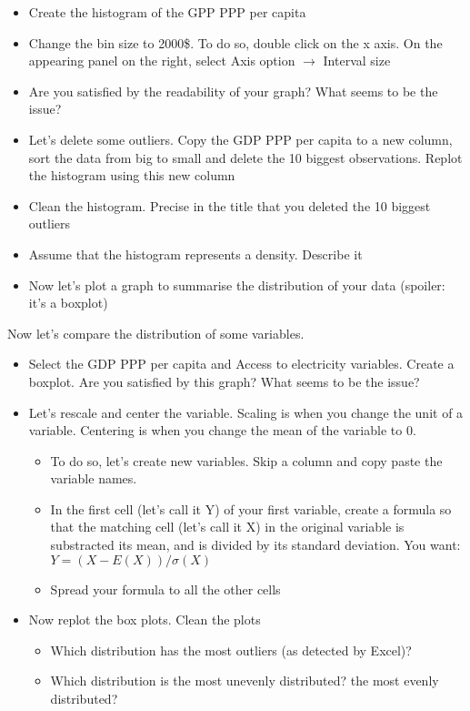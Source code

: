 \documentclass{article}
\begin{document}
    \begin{itemize}
        \item Create the histogram of the GPP PPP per capita
        \item Change the bin size to 2000\$. To do so, double click on the x axis. On the appearing panel on the right, select Axis option $\rightarrow$ Interval size
        \item Are you satisfied by the readability of your graph? What seems to be the issue?
        \item Let's delete some outliers. Copy the GDP PPP per capita to a new column, sort the data from big to small and delete the 10 biggest observations. Replot the histogram using this new column
        \item Clean the histogram. Precise in the title that you deleted the 10 biggest outliers
        \item Assume that the histogram represents a density. Describe it
        \item Now let's plot a graph to summarise the distribution of your data (spoiler: it's a boxplot)
    \end{itemize}
    Now let's compare the distribution of some variables.
    \begin{itemize}
        \item Select the GDP PPP per capita and Access to electricity variables. Create a boxplot. Are you satisfied by this graph? What seems to be the issue?
        \item Let's rescale and center the variable. Scaling is when you change the unit of a variable. Centering is when you change the mean of the variable to 0.
        \begin{itemize}
            \item To do so, let's create new variables. Skip a column and copy paste the variable names.
            \item In the first cell (let's call it Y) of your first variable, create a formula so that the matching cell (let's call it X) in the original variable is substracted its mean, and is divided by its standard deviation. You want: $Y = (X - E(X)) / \sigma(X)$
            \item Spread your formula to all the other cells
        \end{itemize}
    \item Now replot the box plots. Clean the plots
    \begin{itemize}
        \item Which distribution has the most outliers (as detected by Excel)?
        \item Which distribution is the most unevenly distributed? the most evenly distributed?
    \end{itemize} 
    \end{itemize}
\end{document}
